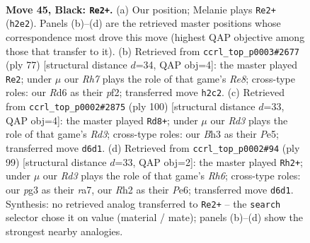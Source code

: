 \documentclass[11pt]{article}
\begin{document}
\clearpage

\begin{figure}[p]\centering
\begin{subfigure}{0.46\textwidth}\centering
\resizebox{\linewidth}{!}{%
\newchessgame
\chessboard[
  setfen={8/5p1p/3r2pk/R7/1p2P3/4K1Pb/7r/6n1 b - - 1 45},
  showmover=false,
  pgfstyle=straightmove, color=movearrow, markmove={h2-e2}
]}
\caption{}
\end{subfigure}\hfill
\begin{subfigure}{0.46\textwidth}\centering
\resizebox{\linewidth}{!}{%
\newchessgame
\chessboard[
  setfen={8/6p1/4p1kp/2R5/7P/8/5PPK/4r3 b - - 2 39},
  showmover=false,
  pgfstyle=straightmove, color=movearrow, markmove={e1-e2}
]}
\caption{}
\end{subfigure}
\\[4pt]
\begin{subfigure}{0.46\textwidth}\centering
\resizebox{\linewidth}{!}{%
\newchessgame
\chessboard[
  setfen={6k1/5p2/6pp/4P3/r7/3R1PKP/6P1/8 w - - 4 51},
  showmover=false,
  pgfstyle=straightmove, color=movearrow, markmove={d3-d8}
]}
\caption{}
\end{subfigure}\hfill
\begin{subfigure}{0.46\textwidth}\centering
\resizebox{\linewidth}{!}{%
\newchessgame
\chessboard[
  setfen={8/R7/3kpp1p/PP1b4/5P2/7r/1NK5/8 b - - 0 50},
  showmover=false,
  pgfstyle=straightmove, color=movearrow, markmove={h3-h2}
]}
\caption{}
\end{subfigure}
\caption{\textbf{Move 45, Black: \texttt{Re2+}.} (a) Our position; Melanie plays \texttt{Re2+} (\texttt{h2e2}). Panels (b)--(d) are the retrieved master positions whose correspondence most drove this move (highest QAP objective among those that transfer to it). (b) Retrieved from \texttt{ccrl\_top\_p0003\#2677} (ply 77) [structural distance $d$=34, QAP obj=4]: the master played \texttt{Re2}; under $\mu$ our \emph{Rh7} plays the role of that game's \emph{Re8}; cross-type roles: our \emph{R}d6 as their \emph{p}f2; transferred move \texttt{h2c2}. (c) Retrieved from \texttt{ccrl\_top\_p0002\#2875} (ply 100) [structural distance $d$=33, QAP obj=4]: the master played \texttt{Rd8+}; under $\mu$ our \emph{Rd3} plays the role of that game's \emph{Rd3}; cross-type roles: our \emph{B}h3 as their \emph{P}e5; transferred move \texttt{d6d1}. (d) Retrieved from \texttt{ccrl\_top\_p0002\#94} (ply 99) [structural distance $d$=33, QAP obj=2]: the master played \texttt{Rh2+}; under $\mu$ our \emph{Rd3} plays the role of that game's \emph{Rh6}; cross-type roles: our \emph{p}g3 as their \emph{r}a7, our \emph{R}h2 as their \emph{P}e6; transferred move \texttt{d6d1}. Synthesis: no retrieved analog transferred to \texttt{Re2+} -- the \texttt{search} selector chose it on value (material / mate); panels (b)--(d) show the strongest nearby analogies.}
\label{fig:thought-m89}
\end{figure}
\end{document}
